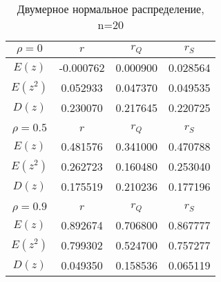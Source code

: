 \begin{table}[H]
    \centering
    \begin{tabular}{c|c|c|c}
        $\rho=0$ & $r$ & $r_{Q}$ & $r_{S}$ \\
        \hline
        $E(z)$ & -0.000762 & 0.000900 & 0.028564 \\
        $E(z^2)$ & 0.052933 & 0.047370 & 0.049535 \\
        $D(z)$ & 0.230070 & 0.217645 & 0.220725 \\
        \multicolumn{4}{c}{} \\
        $\rho=0.5$ & $r$ & $r_{Q}$ & $r_{S}$ \\
        \hline
        $E(z)$ & 0.481576 & 0.341000 & 0.470788 \\
        $E(z^2)$ & 0.262723 & 0.160480 & 0.253040 \\
        $D(z)$ & 0.175519 & 0.210236 & 0.177196 \\
        \multicolumn{4}{c}{} \\
        $\rho=0.9$ & $r$ & $r_{Q}$ & $r_{S}$ \\
        \hline
        $E(z)$ & 0.892674 & 0.706800 & 0.867777 \\
        $E(z^2)$ & 0.799302 & 0.524700 & 0.757277 \\
        $D(z)$ & 0.049350 & 0.158536 & 0.065119 \\
    \end{tabular}
    \caption{Двумерное нормальное распределение, n=20}
    \label{tab:norm20}
\end{table}
